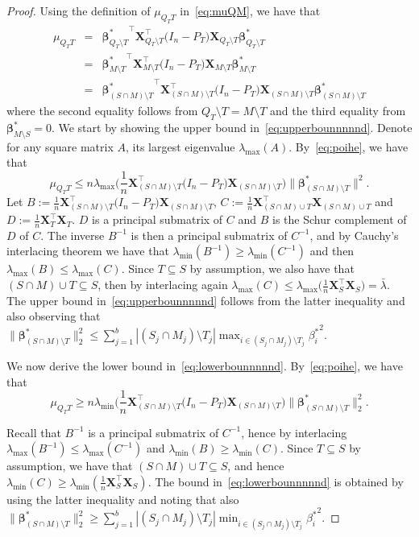 \documentclass[
  12pt]{article}
\newcommand{\bbeta}{\boldsymbol{\beta}}
\newcommand{\bX}{\mathbf{X}}
\begin{document}
\begin{proof}
Using the definition of $\mu_{Q_T T}$ in~\eqref{eq:muQM}, we have that 
\begin{eqnarray}
    \mu_{Q_TT}&=&{\bbeta^*_{Q_T\setminus T}}^{\top}\bX_{Q_T\setminus T}^{\top}  \big(I_n-P_T\big) \bX_{Q_T\setminus T} \bbeta^*_{Q_T\setminus T}\nonumber\\
    &=&{\bbeta^*_{M\setminus T}}^{\top}\bX_{M\setminus T}^{\top}  \big(I_n-P_T\big) \bX_{M\setminus T} \bbeta^*_{M\setminus T}\nonumber\\
    &=&{\bbeta^*_{(S\cap M)\setminus T}}^{\top}\bX_{(S\cap M)\setminus T}^{\top}  \big(I_n-P_T\big) \bX_{(S\cap M)\setminus T} \bbeta^*_{(S\cap M)\setminus T}\label{eq:poihe}
\end{eqnarray}
where the second equality follows from $Q_T\setminus T =M\setminus T $ and the third equality from $\bbeta^*_{M\setminus S}=0$.
We start by showing the upper bound in~\eqref{eq:upperbounnnnnd}. Denote for any square matrix $A$, its largest eigenvalue 
$\lambda_{\max}(A)$. By~\eqref{eq:poihe}, we have that
$$\mu_{Q_TT}\leq n\lambda_{\max}\Big(\frac{1}{n}\bX_{(S\cap M)\setminus T}^{\top}  \big(I_n-P_T\big) \bX_{(S\cap M)\setminus T}\Big) \|\bbeta^*_{(S\cap M)\setminus T}\|^2.$$
Let $B:=\tfrac{1}{n}\bX_{(S\cap M)\setminus T}^{\top}  \big(I_n-P_T\big) \bX_{(S\cap M)\setminus T}$, $C:=\tfrac{1}{n}\bX_{(S\cap M)\cup T}^{\top}\bX_{(S\cap M)\cup T}$ and $D:=\tfrac{1}{n}\bX_T^{\top} \bX_T$. $D$ is a principal submatrix of $C$ and $B$ is the Schur complement of $D$ of $C$. The inverse $B^{-1}$ is then a principal submatrix of $C^{-1}$, and by Cauchy's interlacing theorem we have that   $\lambda_{\min}(B^{-1})\geq \lambda_{\min}(C^{-1})$ and then $\lambda_{\max}(B)\leq \lambda_{\max}(C)$. Since $T \subseteq S$ by assumption, we also have that $(S\cap M)\cup T \subseteq S$, then by interlacing again $\lambda_{\max}(C)\leq \lambda_{\max}\Big(\tfrac{1}{n}\bX_S^{\top}\bX_S\Big)=\bar{\lambda}$. The upper bound in~\eqref{eq:upperbounnnnnd} follows from the latter inequality and also observing that $\|\bbeta^*_{(S\cap M)\setminus T}\|_2^2\leq \sum_{j=1}^b |(S_j\cap M_j)\setminus T_j|\max_{i\in (S_j\cap M_j)\setminus T_j}{\beta_i^*}^2$.

We now derive the lower bound in~\eqref{eq:lowerbounnnnnd}. By~\eqref{eq:poihe}, we have that %
$$\mu_{Q_TT}\geq n\lambda_{\min}\Big(\frac{1}{n}\bX_{(S\cap M)\setminus T}^{\top}  \big(I_n-P_T\big) \bX_{(S\cap M)\setminus T}\Big) \|\bbeta^*_{(S\cap M)\setminus T}\|_2^2.$$

Recall that $B^{-1}$ is a principal submatrix of $C^{-1}$, hence by interlacing $\lambda_{\max}(B^{-1})\leq \lambda_{\max}(C^{-1})$ and $\lambda_{\min}(B)\geq \lambda_{\min}(C)$. Since $T \subseteq S$ by assumption, we have that $(S\cap M)\cup T \subseteq S$, and hence $\lambda_{\min}(C)\geq\lambda_{\min}(\frac{1}{n}\bX_S^{\top} \bX_S)$.
The bound in~\eqref{eq:lowerbounnnnnd} is obtained by using the latter inequality and noting that also $\|\bbeta^*_{(S\cap M)\setminus T}\|_2^2\geq \sum_{j=1}^b |(S_j\cap M_j)\setminus T_j|\min_{i\in (S_j\cap M_j)\setminus T_j}{\beta_i^*}^2.$
\end{proof}
\end{document}
